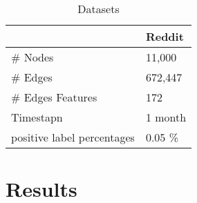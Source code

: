 \documentclass{IEEEtran}
\begin{document}
\begin{table}[htbp]
\caption{\label{Datasets}Datasets}
\centering
\begin{tabular}{ll}
\hline
\hline
 & Reddit\\
\hline
\# Nodes & 11,000\\
\# Edges & 672,447\\
\# Edges Features & 172\\
Timestapn & 1 month\\
positive label percentages & 0.05 \%\\
\end{tabular}
\end{table}

\section{Results}
\label{sec:orgde3654f}
\printbibliography
\end{document}
